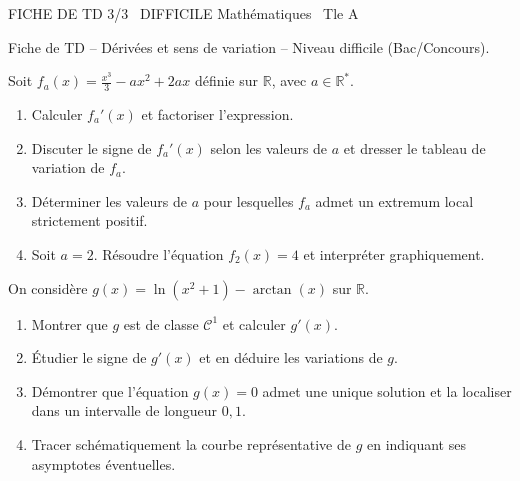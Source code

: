 \documentclass[11pt]{article}
\begin{document}
\begin{tcolorbox}[enhanced,colback=popink,colframe=popink,arc=10pt,boxrule=0pt,left=12pt,right=12pt,top=9pt,bottom=9pt]
{\color{white}\popxbold\small FICHE DE TD 3/3 \textbullet\ DIFFICILE \hfill Mathématiques \textbullet\ Tle A\par}
\end{tcolorbox}
\vspace{4pt}
Fiche de TD – Dérivées et sens de variation – Niveau difficile (Bac/Concours).

\begin{exercice}
Soit $f_a(x)=\frac{x^3}{3}-ax^2+2ax$ définie sur $\mathbb{R}$, avec $a\in\mathbb{R}^*$.
\begin{enumerate}
\item Calculer $f_a'(x)$ et factoriser l'expression.
\item Discuter le signe de $f_a'(x)$ selon les valeurs de $a$ et dresser le tableau de variation de $f_a$.
\item Déterminer les valeurs de $a$ pour lesquelles $f_a$ admet un extremum local strictement positif.
\item Soit $a=2$. Résoudre l'équation $f_2(x)=4$ et interpréter graphiquement.
\end{enumerate}
\end{exercice}

\begin{exercice}
On considère $g(x)=\ln(x^2+1)-\arctan(x)$ sur $\mathbb{R}$.
\begin{enumerate}
\item Montrer que $g$ est de classe $\mathcal{C}^1$ et calculer $g'(x)$.
\item Étudier le signe de $g'(x)$ et en déduire les variations de $g$.
\item Démontrer que l'équation $g(x)=0$ admet une unique solution et la localiser dans un intervalle de longueur $0,1$.
\item Tracer schématiquement la courbe représentative de $g$ en indiquant ses asymptotes éventuelles.
\end{enumerate}
\end{exercice}
\end{document}
